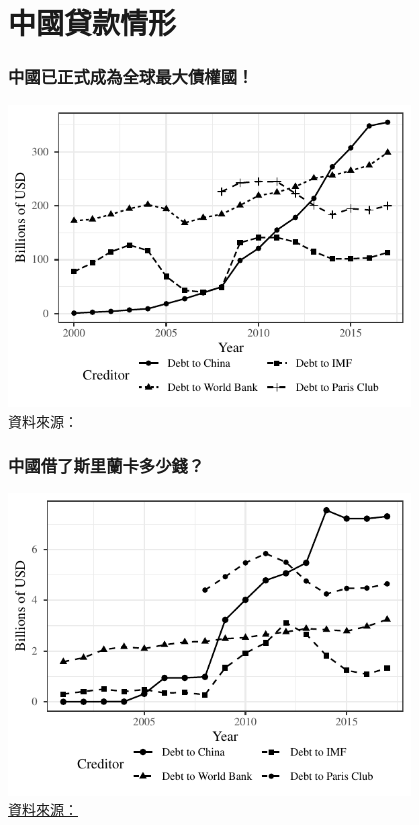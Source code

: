 \documentclass[mathserif]{beamer}
\begin{document}
    \section{中國貸款情形}

    \begin{frame}
        \frametitle{中國已正式成為全球最大債權國！}
        \centering
        \includegraphics[width = 0.8\textwidth]{fig/aggr_debt_source.pdf}\\
        \small 資料來源：\citet*{Horn-Reinhart-Trebesch-21}
    \end{frame}

    \begin{frame}[label = {sri_ts}]
        \frametitle{中國借了斯里蘭卡多少錢？}
        \begin{center}
            \includegraphics[width = 0.8\textwidth]{fig/ALL/Sri Lanka_debt_source.pdf}\\
            \small \hyperlink{sri_ds}{資料來源：}\citet*{Horn-Reinhart-Trebesch-21}
        \end{center}
    \end{frame}
\end{document}
